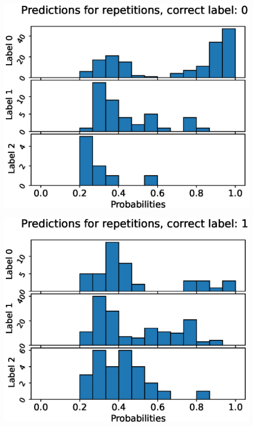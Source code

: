 \begin{center}
\begin{minipage}{0.33\textwidth}
  \includegraphics[width=\textwidth]{files/figs/app/hists/pelvis/pr0.eps}
\end{minipage}%
\begin{minipage}{0.33\textwidth}
  \includegraphics[width=\textwidth]{files/figs/app/hists/pelvis/pr1.eps}
\end{minipage}%
\begin{minipage}{0.33\textwidth}

\end{minipage}
\end{center}
